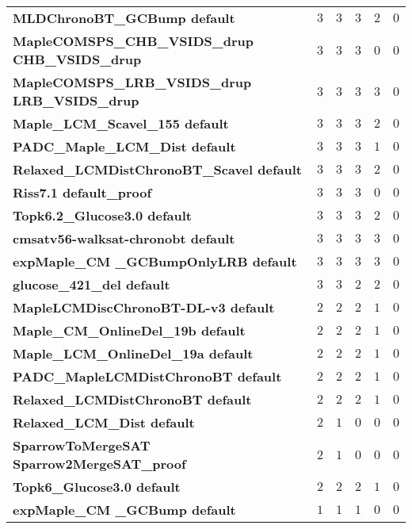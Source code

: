 \begin{tabular}{llllll}
\textbf{MLDChronoBT_GCBump default                    } &         $3$ &     $3$ &      $3$ &       $2$ &          $0$ \\
\textbf{MapleCOMSPS_CHB_VSIDS_drup CHB_VSIDS_drup     } &         $3$ &     $3$ &      $3$ &       $0$ &          $0$ \\
\textbf{MapleCOMSPS_LRB_VSIDS_drup LRB_VSIDS_drup     } &         $3$ &     $3$ &      $3$ &       $3$ &          $0$ \\
\textbf{Maple_LCM_Scavel_155 default                  } &         $3$ &     $3$ &      $3$ &       $2$ &          $0$ \\
\textbf{PADC_Maple_LCM_Dist default                   } &         $3$ &     $3$ &      $3$ &       $1$ &          $0$ \\
\textbf{Relaxed_LCMDistChronoBT_Scavel default        } &         $3$ &     $3$ &      $3$ &       $2$ &          $0$ \\
\textbf{Riss7.1 default_proof                         } &         $3$ &     $3$ &      $3$ &       $0$ &          $0$ \\
\textbf{Topk6.2_Glucose3.0 default                    } &         $3$ &     $3$ &      $3$ &       $2$ &          $0$ \\
\textbf{cmsatv56-walksat-chronobt default             } &         $3$ &     $3$ &      $3$ &       $3$ &          $0$ \\
\textbf{expMaple_CM _GCBumpOnlyLRB default            } &         $3$ &     $3$ &      $3$ &       $3$ &          $0$ \\
\textbf{glucose_421_del default                       } &         $3$ &     $3$ &      $2$ &       $2$ &          $0$ \\
\textbf{MapleLCMDiscChronoBT-DL-v3 default            } &         $2$ &     $2$ &      $2$ &       $1$ &          $0$ \\
\textbf{Maple_CM_OnlineDel_19b default                } &         $2$ &     $2$ &      $2$ &       $1$ &          $0$ \\
\textbf{Maple_LCM_OnlineDel_19a default               } &         $2$ &     $2$ &      $2$ &       $1$ &          $0$ \\
\textbf{PADC_MapleLCMDistChronoBT default             } &         $2$ &     $2$ &      $2$ &       $1$ &          $0$ \\
\textbf{Relaxed_LCMDistChronoBT default               } &         $2$ &     $2$ &      $2$ &       $1$ &          $0$ \\
\textbf{Relaxed_LCM_Dist default                      } &         $2$ &     $1$ &      $0$ &       $0$ &          $0$ \\
\textbf{SparrowToMergeSAT Sparrow2MergeSAT_proof      } &         $2$ &     $1$ &      $0$ &       $0$ &          $0$ \\
\textbf{Topk6_Glucose3.0 default                      } &         $2$ &     $2$ &      $2$ &       $1$ &          $0$ \\
\textbf{expMaple_CM _GCBump default                   } &         $1$ &     $1$ &      $1$ &       $0$ &          $0$ \\
\bottomrule
\end{tabular}
